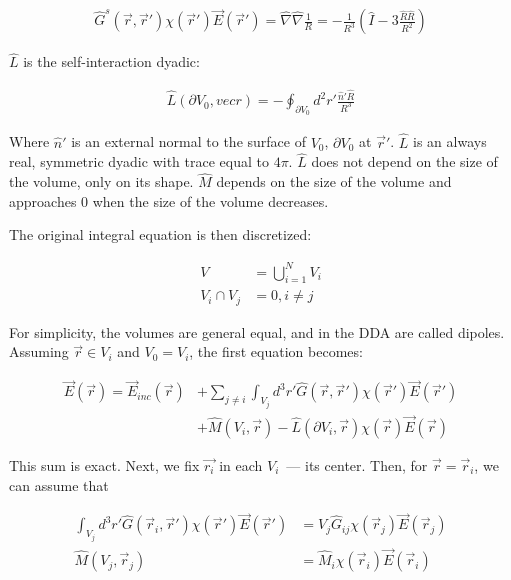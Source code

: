     \begin{align}
        \hat{G}^s(\vec{r}, \vec{r}')\chi(\vec{r}')\vec{E}(\vec{r}') = \hat{\nabla}\hat{\nabla}\frac{1}{R}
                                            = -\frac{1}{R^3}\left(\hat{I}-3\frac{\hat{R}\hat{R}}{R^2}\right)
    \end{align}

    $\hat{L}$ is the self-interaction dyadic:

    \begin{align}
        \hat{L}(\partial V_0, vec{r}) = -\oint_{\partial V_0} d^2 r' \frac{\hat{n}'\hat{R}}{R^3}
    \end{align}

    Where $\hat{n}'$ is an external normal to the surface of $V_0$, $\partial V_0$ at $\vec{r}'$. $\hat{L}$ is an always real, symmetric dyadic
    with trace equal to $4\pi$. $\hat{L}$ does not depend on the size of the volume, only on its shape. $\hat{M}$ depends on the size of the
    volume and approaches $0$ when the size of the volume decreases.

    The original integral equation is then discretized:

    \begin{align}
        V &= \bigcup^N_{i=1}V_i \\
        V_i \cap V_j &= 0, i \neq j
    \end{align}

    For simplicity, the volumes are general equal, and in the DDA are called dipoles. Assuming $\vec{r} \in V_i$ and $V_0 = V_i$, the first
    equation becomes:

    \begin{align}
        \vec{E}(\vec{r}) = \vec{E}_{inc}(\vec{r}) &+ \sum_{j\neq i} \int_{V_j} d^3 r'\hat{G}(\vec{r}, \vec{r}')\chi(\vec{r}')\vec{E}(\vec{r}') \nonumber\\
                                                &+ \hat{M}(V_i, \vec{r}) - \hat{L}(\partial V_i, \vec{r})\chi(\vec{r})\vec{E}(\vec{r})
    \end{align}

    This sum is exact. Next, we fix $\vec{r_i}$ in each $V_i$~--- its center. Then, for $\vec{r}=\vec{r}_i$, we can assume that

    \begin{align}
        \int_{V_j} d^3 r' \hat{G}(\vec{r}_i,\vec{r}')\chi(\vec{r}')\vec{E}(\vec{r}') &= V_j \hat{G}_{ij}\chi(\vec{r}_j)\vec{E}(\vec{r}_j) \\
        \hat{M}(V_j, \vec{r}_j) &= \hat{M}_i \chi(\vec{r}_i)\vec{E}(\vec{r}_i)
    \end{align}

